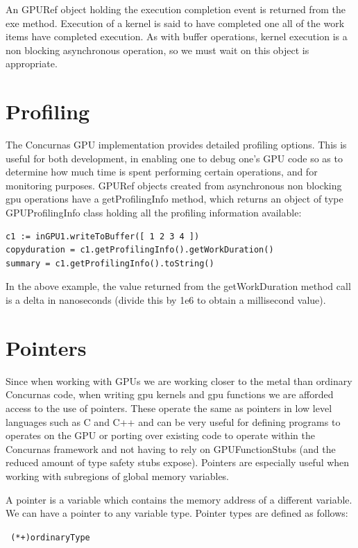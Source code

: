 \documentclass[conc-doc]{subfiles}
\begin{document}
An GPURef object holding the execution completion event is returned from the exe method. Execution of a kernel is said to have completed one all of the work items have completed execution. As with buffer operations, kernel execution is a non blocking asynchronous operation, so we must wait on this object is appropriate.

\section{Profiling}
The Concurnas GPU implementation provides detailed profiling options. This is useful for both development, in enabling one to debug one's GPU code so as to determine how much time is spent performing certain operations, and for monitoring purposes. GPURef objects created from asynchronous non blocking gpu operations have a getProfilingInfo method, which returns an object of type GPUProfilingInfo class holding all the profiling information available:
\begin{lstlisting}
c1 := inGPU1.writeToBuffer([ 1 2 3 4 ])
copyduration = c1.getProfilingInfo().getWorkDuration()
summary = c1.getProfilingInfo().toString()
\end{lstlisting}

In the above example, the value returned from the getWorkDuration method call is a delta in nanoseconds (divide this by 1e6 to obtain a millisecond value).

\section{Pointers}
Since when working with GPUs we are working closer to the metal than ordinary Concurnas code, when writing gpu kernels and gpu functions we are afforded access to the use of pointers. These operate the same as pointers in low level languages such as C and C++ and can be very useful for defining programs to operates on the GPU or porting over existing code to operate within the Concurnas framework and not having to rely on GPUFunctionStubs (and the reduced amount of type safety stubs expose). Pointers are especially useful when working with subregions of global memory variables.

A pointer is a variable which contains the memory address of a different variable. We can have a pointer to any variable type. Pointer types are defined as follows:
\begin{center}
	\lstinline{ (*+)ordinaryType }
\end{center}
\end{document}
